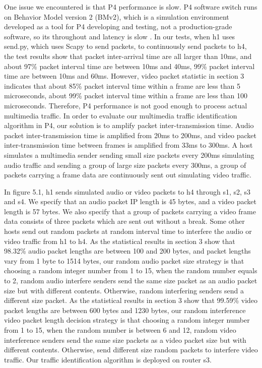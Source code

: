 \documentclass[master]{thesis}
\begin{document}
One issue we encountered is that P4 performance is slow. P4 software switch runs on Behavior Model version 2 (BMv2), which is a simulation environment developed as a tool for P4 developing and testing, not a production-grade software, so its throughout and latency is slow \cite{p4language2016}. In our tests, when h1 uses send.py, which uses Scapy \cite{scapy2020} to send packets, to continuously send packets to h4, the test results show that packet inter-arrival time are all larger than 10ms, and about 97\% packet interval time are between 10ms and 40ms, 99\% packet interval time are between 10ms and 60ms. However, video packet statistic in section 3 indicates that about 85\% packet interval time within a frame are less than 5 microseconds, about 99\% packet interval time within a frame are less than 100 microseconds. Therefore, P4 performance is not good enough to process actual multimedia traffic. In order to evaluate our multimedia traffic identification algorithm in P4, our solution is to amplify packet inter-transmission time. Audio packet inter-transmission time is amplified from 20ms to 200ms, and video packet inter-transmission time between frames is amplified from 33ms to 300ms. A host simulates a multimedia sender sending small size packets every 200ms simulating audio traffic and sending a group of large size packets every 300ms, a group of packets carrying a frame data are continuously sent out simulating video traffic. 

In figure 5.1, h1 sends simulated audio or video packets to h4 through s1, s2, s3 and s4. We specify that an audio packet IP length is 45 bytes, and a video packet length is 57 bytes. We also specify that a group of packets carrying a video frame data consists of three packets which are sent out without a break.  Some other hosts send out random packets at random interval time to interfere the audio or video traffic from h1 to h4. As the statistical results in section 3 show that 98.32\% audio packet lengths are between 100 and 200 bytes, and packet lengths vary from 1 byte to 1514 bytes, our random audio packet size strategy is that choosing a random integer number from 1 to 15, when the random number equals to 2, random audio interfere senders send the same size packet as an audio packet size but with different contents. Otherwise, random interfering senders send a different size packet. As the statistical results in section 3 show that 99.59\% video packet lengths are between 600 bytes and 1230 bytes, our random interference video packet length decision strategy is that choosing a random integer number from 1 to 15, when the random number is between 6 and 12, random video interference senders send the same size packets as a video packet size but with different contents. Otherwise, send different size random packets to interfere video traffic. Our traffic identification algorithm is deployed on router s3. 
\end{document}
